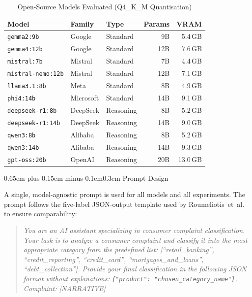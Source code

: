 \documentclass[10pt,a4paper,twocolumn]{article}
\makeatletter
\renewcommand\subsection{\@startsection{subsection}{2}{0pt}%
  {0.65em plus 0.15em minus 0.1em}{0.3em}%
  {\normalfont\normalsize\itshape}}
\makeatother
\begin{document}
\begin{table}[!t]
  \renewcommand{\arraystretch}{1.2}
  \caption{Open-Source Models Evaluated (Q4\_K\_M Quantisation)}
  \label{tab:models}
  \centering
  \footnotesize
  \setlength{\tabcolsep}{4pt}
  \begin{tabular}{@{}lllrr@{}}
    \toprule
    \textbf{Model} & \textbf{Family} & \textbf{Type} & \textbf{Params} & \textbf{VRAM} \\
    \midrule
    \texttt{gemma2:9b}         & Google     & Standard  & 9B   & 5.4\,GB \\
    \texttt{gemma4:12b}        & Google     & Standard  & 12B  & 7.6\,GB \\
    \texttt{mistral:7b}        & Mistral    & Standard  & 7B   & 4.4\,GB \\
    \texttt{mistral-nemo:12b}  & Mistral    & Standard  & 12B  & 7.1\,GB \\
    \texttt{llama3.1:8b}       & Meta       & Standard  & 8B   & 4.9\,GB \\
    \texttt{phi4:14b}          & Microsoft  & Standard  & 14B  & 9.1\,GB \\
    \midrule
    \texttt{deepseek-r1:8b}    & DeepSeek   & Reasoning & 8B   & 5.2\,GB \\
    \texttt{deepseek-r1:14b}   & DeepSeek   & Reasoning & 14B  & 9.0\,GB \\
    \texttt{qwen3:8b}          & Alibaba    & Reasoning & 8B   & 5.2\,GB \\
    \texttt{qwen3:14b}         & Alibaba    & Reasoning & 14B  & 9.3\,GB \\
    \texttt{gpt-oss:20b}       & OpenAI     & Reasoning & 20B  & 13.0\,GB \\
    \bottomrule
  \end{tabular}
\end{table}

\subsection{Prompt Design}

A single, model-agnostic prompt is used for all models and all
experiments. The prompt follows the five-label JSON-output template
used by Roumeliotis~et~al.\ \cite{roumeliotis2025think} to ensure
comparability:

\begin{quote}
\textit{You are an AI assistant specializing in consumer complaint
classification. Your task is to analyze a consumer complaint and
classify it into the most appropriate category from the predefined
list: [``retail\_banking'', ``credit\_reporting'', ``credit\_card'',
``mortgages\_and\_loans'', ``debt\_collection'']. Provide your final
classification in the following JSON format without explanations:
\texttt{\{"product": "chosen\_category\_name"\}}. Complaint: [NARRATIVE]}
\end{quote}
\end{document}
